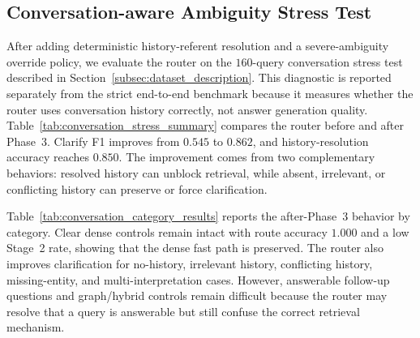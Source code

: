 \documentclass[11pt,twocolumn]{article}
\begin{document}
\subsection{Conversation-aware Ambiguity Stress Test}
\label{subsec:conversation_ambiguity_results}

After adding deterministic history-referent resolution and a
severe-ambiguity override policy, we evaluate the router on the
$160$-query conversation stress test described in
Section~\ref{subsec:dataset_description}. This diagnostic is
reported separately from the strict end-to-end benchmark because
it measures whether the router uses conversation history
correctly, not answer generation quality.
Table~\ref{tab:conversation_stress_summary} compares the router
before and after Phase~3. Clarify F1 improves from $0.545$ to
$0.862$, and history-resolution accuracy reaches $0.850$. The
improvement comes from two complementary behaviors: resolved
history can unblock retrieval, while absent, irrelevant, or
conflicting history can preserve or force clarification.

\begin{table}[!htbp]
\centering
\caption{Diagnostic conversation-aware ambiguity stress-test results.}
\label{tab:conversation_stress_summary}
\scriptsize
\setlength{\tabcolsep}{2.2pt}
\end{table}

Table~\ref{tab:conversation_category_results} reports the
after-Phase~3 behavior by category. Clear dense controls
remain intact with route accuracy $1.000$ and a low Stage~2
rate, showing that the dense fast path is preserved. The
router also improves clarification for no-history, irrelevant
history, conflicting history, missing-entity, and
multi-interpretation cases. However, answerable follow-up
questions and graph/hybrid controls remain difficult because
the router may resolve that a query is answerable but still
confuse the correct retrieval mechanism.
\end{document}
